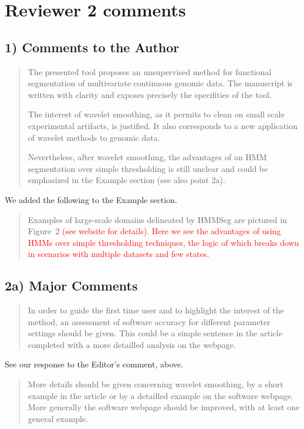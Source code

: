 \documentclass{article}
\newcommand{\breview}{\begin{quotation}\begin{em}\noindent}
\newcommand{\ereview}{\end{em}\end{quotation}}
\begin{document}
\section*{Reviewer 2 comments}

\subsection*{1) Comments to the Author}

\breview  The presented tool proposes an unsupervised method for
functional segmentation of multivariate continuous genomic data.  The
manuscript is written with clarity and exposes precisely the
specifities of the tool.

The interest of wavelet smoothing, as it permits to clean on small
scale experimental artifacts, is justified. It also corresponds to a
new application of wavelet methods to genomic data.

Nevertheless, after wavelet smoothing, the advantages of an HMM
segmentation over simple thresholding is still unclear and could be
emphasized in the Example section (see also point 2a).  
\ereview

We added the following to the Example section.

\begin{quotation}
Examples of large-scale domains delineated by HMMSeg are pictured in
Figure~2 \textcolor{red}{(see website for details).  Here we see the
advantages of using HMMs over simple thresholding techniques, the
logic of which breaks down in scenarios with multiple datasets and few
states.}
\end{quotation}

\subsection*{2a) Major Comments}

\breview
In order to guide the first time user and to highlight the interest
of the method, an assessment of software accuracy for different
parameter settings should be given. This could be a simple sentence in
the article completed with a more detailled analysis on the webpage.
\ereview

See our response to the Editor's comment, above.
 
\breview More details should be given concerning wavelet smoothing, by
a short example in the article or by a detailled example on the
software webpage.  More generally the software webpage should be
improved, with at least one general example.  \ereview
\end{document}
